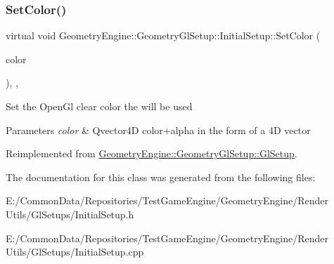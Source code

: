 \mbox{\label{class_geometry_engine_1_1_geometry_gl_setup_1_1_initial_setup_a403192af4493ada23671bf1d95f2da89}} 
\subsubsection{\texorpdfstring{SetColor()}{SetColor()}}
{\footnotesize\ttfamily virtual void Geometry\+Engine\+::\+Geometry\+Gl\+Setup\+::\+Initial\+Setup\+::\+Set\+Color (\begin{DoxyParamCaption}\item[{const Q\+Vector4D \&}]{color }\end{DoxyParamCaption})\hspace{0.3cm}{\ttfamily [inline]}, {\ttfamily [override]}, {\ttfamily [virtual]}}

Set the Open\+Gl clear color the will be used 
\begin{DoxyParams}{Parameters}
{\em color} & Qvector4D color+alpha in the form of a 4D vector \\
\hline
\end{DoxyParams}


Reimplemented from \mbox{\hyperlink{class_geometry_engine_1_1_geometry_gl_setup_1_1_gl_setup_acd5b3b2525d11f103f1d3cf298d4af94}{Geometry\+Engine\+::\+Geometry\+Gl\+Setup\+::\+Gl\+Setup}}.



The documentation for this class was generated from the following files\+:\begin{DoxyCompactItemize}
\item 
E\+:/\+Common\+Data/\+Repositories/\+Test\+Game\+Engine/\+Geometry\+Engine/\+Render Utils/\+Gl\+Setups/Initial\+Setup.\+h\item 
E\+:/\+Common\+Data/\+Repositories/\+Test\+Game\+Engine/\+Geometry\+Engine/\+Render Utils/\+Gl\+Setups/Initial\+Setup.\+cpp\end{DoxyCompactItemize}
